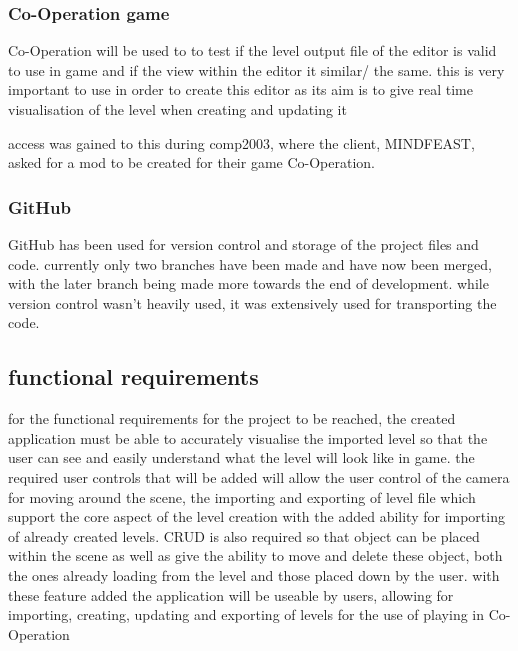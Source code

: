 \subsubsection{Co-Operation game}
Co-Operation will be used to to test if the level output file of the editor is valid to use in game and if the view within the editor it similar/ the same. this is very important to use in order to create this editor as its aim is to give real time visualisation of the level when creating and updating it

access was gained to this during comp2003, where the client, MINDFEAST, asked for a mod to be created for their game Co-Operation.
\subsubsection{GitHub}
GitHub has been used for version control and storage of the project files and code. currently only two branches have been made and have now been merged, with the later branch being made more towards the end of development. while version control wasn't heavily used, it was extensively used for transporting the code.

\subsection{functional requirements}
for the functional requirements for the project to be reached, the created application must be able to accurately visualise the imported level so that the user can see and easily understand what the level will look like in game. the required user controls that will be added will allow the user control of the camera for moving around the scene, the importing and exporting of level file which support the core aspect of the level creation with the added ability for importing of already created levels. CRUD is also required so that object can be placed within the scene as well as give the ability to move and delete these object, both the ones already loading from the level and those placed down by the user. with these feature added the application will be useable by users, allowing for importing, creating, updating and exporting of levels for the use of playing in Co-Operation

